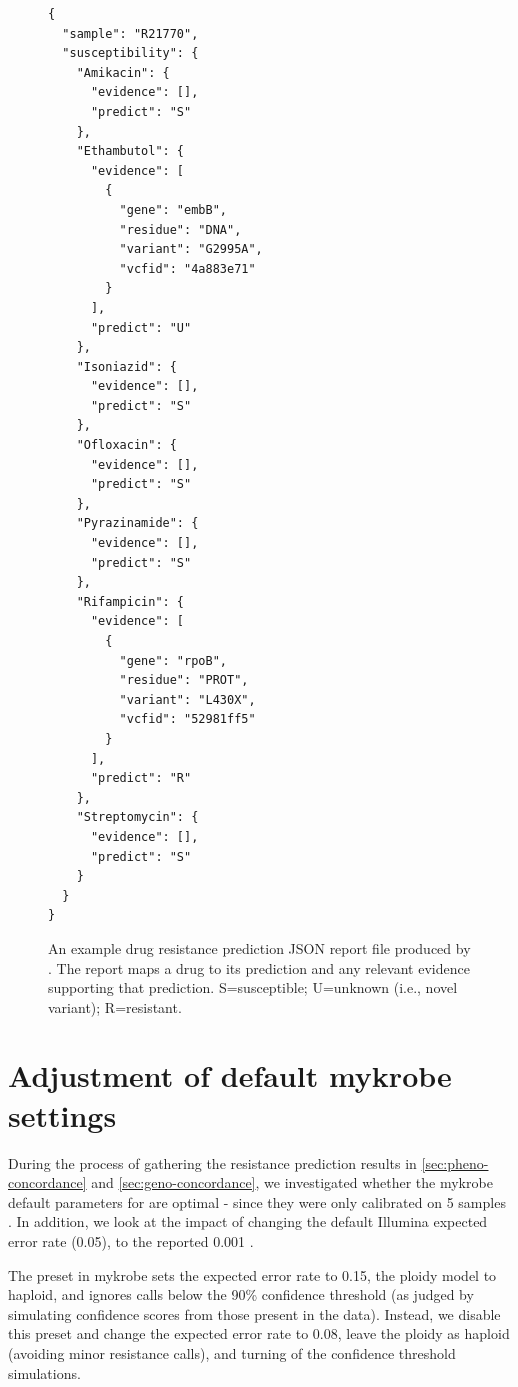 \begin{figure}
\begin{verbatim}
{
  "sample": "R21770",
  "susceptibility": {
    "Amikacin": {
      "evidence": [],
      "predict": "S"
    },
    "Ethambutol": {
      "evidence": [
        {
          "gene": "embB",
          "residue": "DNA",
          "variant": "G2995A",
          "vcfid": "4a883e71"
        }
      ],
      "predict": "U"
    },
    "Isoniazid": {
      "evidence": [],
      "predict": "S"
    },
    "Ofloxacin": {
      "evidence": [],
      "predict": "S"
    },
    "Pyrazinamide": {
      "evidence": [],
      "predict": "S"
    },
    "Rifampicin": {
      "evidence": [
        {
          "gene": "rpoB",
          "residue": "PROT",
          "variant": "L430X",
          "vcfid": "52981ff5"
        }
      ],
      "predict": "R"
    },
    "Streptomycin": {
      "evidence": [],
      "predict": "S"
    }
  }
}
\end{verbatim}
\caption{An example drug resistance prediction JSON report file produced by \drprg{}. The report maps a drug to its prediction and any relevant evidence supporting that prediction. S=susceptible; U=unknown (i.e., novel variant); R=resistant.}
\label{fig:example-drprg-report}
\end{figure}

\section{Adjustment of default mykrobe \ont{} settings}
\label{app:mykrobe-settings}

During the process of gathering the resistance prediction results in \autoref{sec:pheno-concordance} and \autoref{sec:geno-concordance}, we investigated whether the mykrobe default parameters for \ont{} are optimal - since they were only calibrated on 5 samples \cite{hunt2019}. In addition, we look at the impact of changing the default Illumina expected error rate (0.05), to the reported 0.001 \cite{manley2016}.

The \ont{} preset in mykrobe sets the expected error rate to 0.15, the ploidy model to haploid, and ignores calls below the 90\% confidence threshold (as judged by simulating confidence scores from those present in the data). Instead, we disable this preset and change the expected error rate to 0.08, leave the ploidy as haploid (avoiding minor resistance calls), and turning of the confidence threshold simulations.

